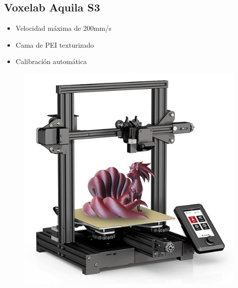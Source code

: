 \documentclass[compacto,5pt,comentarios]{aleph-notas}
\begin{document}
\newpage
\subsection{Voxelab Aquila S3}
\begin{advertencia}
\begin{itemize}
    \item Velocidad máxima de 200mm/s
    \item Cama de PEI texturizado
    \item Calibración automática
\end{itemize}
\end{advertencia}

\begin{figure}[h]
    \centering
    \includegraphics[width=0.5\linewidth]{Logos/AquilaS3.jpg}
    \label{fig:enter-label}
\end{figure}

\end{document}

